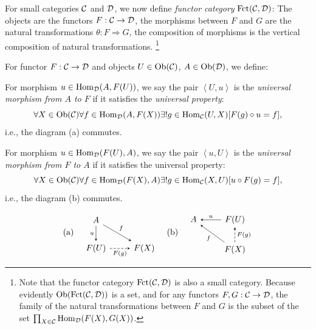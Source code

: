 \documentclass{article}
\begin{document}
\begin{defi}
	For small categories $\mathcal{C}$ and $\mathcal{D}$, we now define \emph{functor category} $\mathrm{Fct}(\mathcal{C},\mathcal{D})$: The objects are the functors $F:\mathcal{C}\to\mathcal{D}$, the morphisms between $F$ and $G$ are the natural transformations $\theta:F\Rightarrow G$, the composition of morphisms is the vertical composition of natural transformations.
		\footnote{Note that the functor category $\mathrm{Fct}(\mathcal{C},\mathcal{D})$ is also a small category. Because evidently $\mathrm{Ob}(\mathrm{Fct}(\mathcal{C},\mathcal{D}))$ is a set, and for any functors $F,G:\mathcal{C}\to\mathcal{D}$, the family of the natural transformations between $F$ and $G$ is the subset of the set $\prod_{X\in\mathcal{C}}{\mathrm{Hom}_{\mathcal{D}}(F(X),G(X))}$.}
\end{defi}


\begin{defi}
	For functor $F:\mathcal{C}\to\mathcal{D}$ and objects $U\in\mathrm{Ob}(\mathcal{C})$, $A\in\mathrm{Ob}(\mathcal{D})$, we define:
	
	For morphism $u\in\mathrm{Hom}_{\mathcal{D}}(A,F(U))$, we say the pair $\left<U,u\right>$ is the \emph{universal morphism from $A$ to $F$} if it satisfies the \emph{universal property}:
		$$\forall X\in\mathrm{Ob}(\mathcal{C})\forall f\in\mathrm{Hom}_{\mathcal{D}}(A,F(X))\exists!g\in\mathrm{Hom}_{\mathcal{C}}(U,X)[F(g)\circ u=f],$$
	i.e., the diagram (a) commutes.
	
	For morphism $u\in\mathrm{Hom}_{\mathcal{D}}(F(U),A)$, we say the pair $\left<u,U\right>$ is the \emph{universal morphism from $F$ to $A$} if it satisfies the universal property:
		$$\forall X\in\mathrm{Ob}(\mathcal{C})\forall f\in\mathrm{Hom}_{\mathcal{D}}(F(X),A)\exists!g\in\mathrm{Hom}_{\mathcal{C}}(X,U)[u\circ F(g)=f],$$
	i.e., the diagram (b) commutes.
	
	\[\text{(a)}\quad\begin{tikzcd}
			A \arrow[->,>=stealth, d, "u"'] \arrow[->,>=stealth, rd, "f"] & \\
			F(U) \arrow[->,>=stealth, r, "F(g)"', dashed] & F(X)
		\end{tikzcd}\quad\text{(b)}\quad\begin{tikzcd}
			A & F(U) \arrow[->,>=stealth, l, "u"'] \\
			& F(X) \arrow[->,>=stealth, lu, "f"] \arrow[->,>=stealth, u, "F(g)"', dashed]
	\end{tikzcd}\]
\end{defi}
\end{document}
